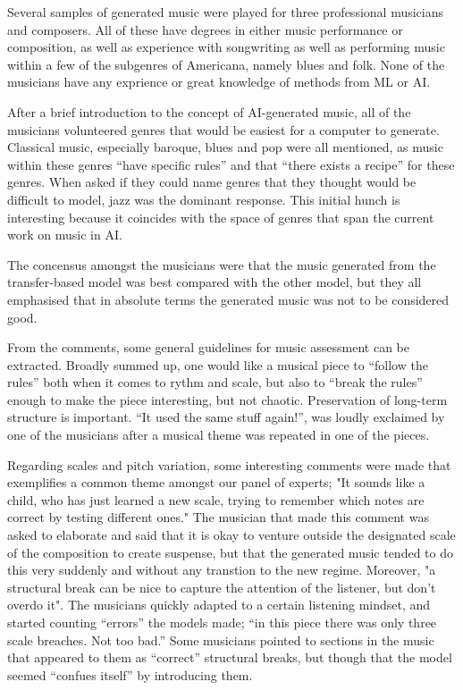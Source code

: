 \documentclass{IEEEtran}
\begin{document}
Several samples of generated music were played for three
professional musicians and composers. All of these have degrees in
either music performance or composition, as well as experience with 
songwriting as well as performing music within a few of the subgenres of 
Americana, namely blues and folk. None of the musicians have any 
exprience or great knowledge of methods from ML or AI.

After a brief introduction to the concept of AI-generated music,
all of the musicians 
volunteered genres that would be easiest for a computer to generate. 
Classical music, especially baroque, blues and pop were all mentioned, 
as music within these genres ``have specific rules'' and that 
``there exists a recipe'' for these genres.
When asked if they could name genres that 
they thought would be difficult to model, jazz was the dominant response.
This initial hunch is interesting because 
it coincides with the space of genres that span the current work on music 
in AI.

The concensus amongst the musicians were that the music generated from 
the transfer-based model was best compared with the other model, but they
all emphasised that in absolute terms the generated music was not to be 
considered good.

From the comments, some general guidelines for music assessment can be 
extracted. Broadly summed up, one would like a musical piece to
``follow the rules'' both when it comes to rythm and scale, but also to 
``break the rules'' enough to make the piece interesting, but not 
chaotic. Preservation of long-term structure is important.
``It used the same stuff again!'', was loudly exclaimed 
by one of the musicians after a musical theme was repeated in one of the 
pieces.

Regarding scales and pitch variation, some interesting comments were 
made that exemplifies a common theme amongst our panel of experts;
"It sounds like a child, who has just learned a new scale, trying 
to remember which notes are correct by testing different ones." 
The musician that made this comment was asked to elaborate and 
said that it is okay to venture outside the designated scale of the 
composition to create suspense, but that the generated music tended 
to do this very suddenly and without any transtion to the new 
regime. Moreover, "a structural break
can be nice to capture the attention of the listener, but don't overdo
it". The musicians quickly adapted to a certain listening mindset, and
started counting ``errors'' the models made; ``in this piece there was 
only three scale breaches. Not too bad.'' Some musicians pointed to sections 
in the music that appeared to them as ``correct'' structural breaks, but 
though that the model seemed ``confues itself'' by introducing them.
\end{document}
